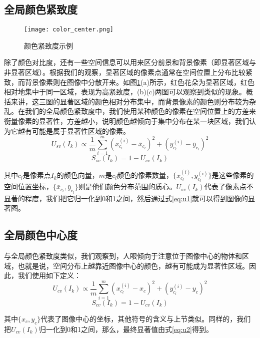 \subsection{全局颜色紧致度}
\begin{figure}
\centering
\texttt{[image: color\_center.png]}
\caption{颜色紧致度示例}\label{fig:color_center}
\end{figure}
除了颜色对比度，还有一些空间信息可以用来区分前景和背景像素（即显著区域与非显著区域）。根据我们的观察，显著区域的像素点通常在空间位置上分布比较紧致，而背景像素则在图像中分散开来。如图\ref{fig:color_center}(a)所示，红色花朵为显著区域，红色相对地集中于同一区域，表现为高紧致度，(b)(c)两图可以观察到类似的现象。概括来讲，这三图的显著区域的颜色相对分布集中，而背景像素的颜色则分布较为杂乱。在我们的全局颜色紧致度中，我们使用某种颜色的像素在空间位置上的方差来衡量像素的显著性，方差越小，说明颜色越倾向于集中分布在某一块区域，我们认为它越有可能是属于显著性区域的像素。
\begin{equation}
  U_{sv}(I_k) \propto \frac{1}{m}\sum_{i=1}^{m}(x_{c_l}^{(i)} - \bar{x}_{c_l})^2 + (y_{c_l}^{(i)} - \bar{y}_{c_l})^2 \label{eq:u0}
\end{equation}
\begin{equation}
  S_{sv}(I_k) = 1 - U_{sv}(I_k) \label{eq:u1}
\end{equation}

其中$c_l$是像素点$I_k$的颜色向量，$m$是$c_l$颜色的像素数量，$\{x_{c_l}^{(i)},y_{c_l}^{(i)}\}$是这些像素的空间位置坐标，$\{\bar{x}_{c_l},\bar{y}_{c_l}\}$则是他们颜色分布范围的质心。$U_{sv}(I_k)$代表了像素点不显著的程度，我们把它归一化到0和1之间，然后通过式\ref{eq:u1}就可以得到图像的显著图。

\subsection{全局颜色中心度}
与全局颜色紧致度类似，我们观察到，人眼倾向于注意位于图像中心的物体和区域，也就是说，空间分布上越靠近图像中心的颜色，越有可能成为显著性区域。因此，我们使用如下定义：
\begin{equation}
  U_{cv}(I_k) \propto \frac{1}{m}\sum_{i=1}^{m}(x_{c_l}^{(i)} - x_c)^2 + (y_{c_l}^{(i)} - y_c)^2
\end{equation}
\begin{equation}
  S_{cv}(I_k) = 1 - U_{cv}(I_k) \label{eq:u2}
\end{equation}

其中$\{x_c, y_c\}$代表了图像中心的坐标，其他符号的含义与上节类似。同样的，我们把$U_{cv}(I_k)$归一化到0和1之间，那么，最终显著值由式\ref{eq:u2}得到。

